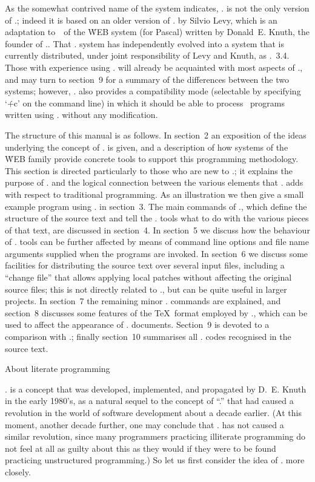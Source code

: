 As the somewhat contrived name of the system indicates, \CWEBx. is not the
only version of \CWEB.; indeed it is based on an older version of \CWEB. by
Silvio Levy, which is an adaptation to~\Cee\ of the \.{WEB} system (for
Pascal) written by Donald~E. Knuth, the founder of \lp.. That \CWEB. system
has independently evolved into a system that is currently distributed, under
joint responsibility of Levy and Knuth, as \CWEB.~3.4. Those with experience
using \LKC. will already be acquainted with most aspects of \CWEBx., and may
turn to section~9 for a summary of the differences between the two systems;
however, \CWEBx. also provides a compatibility mode (selectable by specifying
`\.{+c}' on the command line) in which it should be able to process
\Cee~programs written using \LKC. without any modification.

The structure of this manual is as follows. In section~2 an exposition of
the ideas underlying the concept of \lp. is given, and a description of how
systems of the \.{WEB} family provide concrete tools to support this
programming methodology. This section is directed particularly to those who
are new to \lp.; it explains the purpose of \CWEB. and the logical
connection between the various elements that \lp. adds with respect to
traditional programming. As an illustration we then give a small example
program using \CWEB. in section~3. The main commands of \CWEB., which define
the structure of the source text and tell the \CWEB. tools what to do with
the various pieces of that text, are discussed in section~4. In section~5 we
discuss how the behaviour of \CWEB. tools can be further affected by means
of command line options and file name arguments supplied when the programs
are invoked. In section~6 we discuss some facilities for distributing the
source text over several input files, including a ``change file'' that
allows applying local patches without affecting the original source files;
this is not directly related to \lp., but can be quite useful in larger
projects. In section~7 the remaining minor \CWEB. commands are explained,
and section~8 discusses some features of the \TeX\ format employed by
\CWEB., which can be used to affect the appearance of \CWEB.  documents.
Section~9 is devoted to a comparison with \LKC.; finally section~10
summarises all \CWEB. codes recognised in the source text.


\beginsection About literate programming

\Lp. is a concept that was developed, implemented, and propagated by D.~E.
Knuth in the early 1980's, as a natural sequel to the concept of ``\sp.''
that had caused a revolution in the world of software development about a
decade earlier. (At this moment, another decade further, one may conclude
that \lp. has not caused a similar revolution, since many programmers
practicing illiterate programming do not feel at all as guilty about this as
they would if they were to be found practicing unstructured programming.) So
let us first consider the idea of \sp. more closely.


